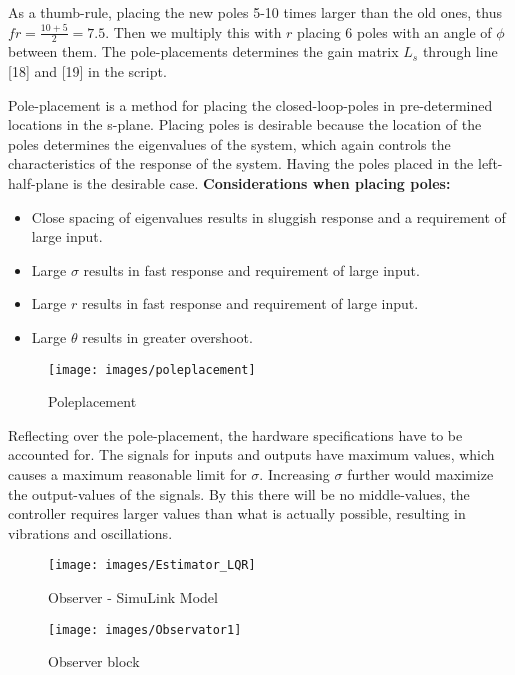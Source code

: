 As a thumb-rule, placing the new poles 5-10 times larger than the old ones, thus $fr = \frac{10+5}{2}=7.5$. Then we multiply this with $r$ placing 6 poles with an angle of $\phi$ between them. The pole-placements determines the gain matrix $L_s$ through line [18] and [19] in the script.

Pole-placement is a method for placing the closed-loop-poles in pre-determined locations in the s-plane. Placing poles is desirable because the location of the poles determines the eigenvalues of the system, which again controls the characteristics of the response of the system. Having the poles placed in the left-half-plane is the desirable case. 
\newpage
\renewcommand\labelitemi{\tiny$\bullet$}
\textbf{Considerations when placing poles:}
\begin{itemize}
\item Close spacing of eigenvalues results in sluggish response and a requirement of large input.
\item Large $\sigma$ results in fast response and requirement of large input.
\item Large $r$ results in fast response and requirement of large input.
\item Large $\theta$ results in greater overshoot.
\end{itemize}

\begin{figure}[!htb]
    \centering
    \texttt{[image: images/poleplacement]}
    \caption{Poleplacement}
    \label{poles}
\end{figure}

Reflecting over the pole-placement, the hardware specifications have to be accounted for. The signals for inputs and outputs have maximum values, which causes a maximum reasonable limit for $\sigma$. Increasing $\sigma$ further would maximize the output-values of the signals. By this there will be no middle-values, the controller requires larger values than what is actually possible, resulting in vibrations and oscillations.
\newpage
\begin{figure}[!htb]
    \centering
    \texttt{[image: images/Estimator\_LQR]}
    \caption{Observer - SimuLink Model}
    \label{Observer}
\end{figure}

\begin{figure}[!htb]
    \centering
    \texttt{[image: images/Observator1]}
    \caption{Observer block}
    \label{poles}
\end{figure}

